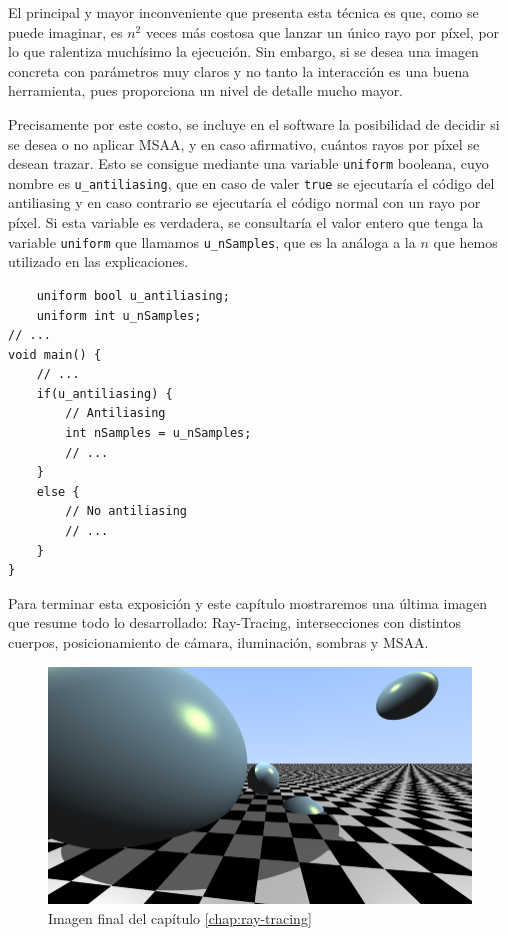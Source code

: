 El principal y mayor inconveniente que presenta esta técnica es que, como se puede imaginar, es $n^2$ veces más costosa que lanzar un único rayo por píxel, por lo que ralentiza muchísimo la ejecución. Sin embargo, si se desea una imagen concreta con parámetros muy claros y no tanto la interacción es una buena herramienta, pues proporciona un nivel de detalle mucho mayor.

Precisamente por este costo, se incluye en el software la posibilidad de decidir si se desea o no aplicar MSAA, y en caso afirmativo, cuántos rayos por píxel se desean trazar. Esto se consigue mediante una variable \verb|uniform| booleana, cuyo nombre es \verb|u_antiliasing|, que en caso de valer \verb|true| se ejecutaría el código del antiliasing y en caso contrario se ejecutaría el código normal con un rayo por píxel. Si esta variable es verdadera, se consultaría el valor entero que tenga la variable \verb|uniform| que llamamos \verb|u_nSamples|, que es la análoga a la $n$ que hemos utilizado en las explicaciones. 

\begin{lstlisting}
    uniform bool u_antiliasing;
    uniform int u_nSamples;
// ...
void main() {
    // ... 
    if(u_antiliasing) {
        // Antiliasing
        int nSamples = u_nSamples;
        // ... 
    }
    else {
        // No antiliasing
        // ...
    }
}   
\end{lstlisting}

Para terminar esta exposición y este capítulo mostraremos una última imagen que resume todo lo desarrollado: Ray-Tracing, intersecciones con distintos cuerpos, posicionamiento de cámara, iluminación, sombras y MSAA.


\begin{figure} [ht]
    \centering
    \includegraphics[scale = 0.45]{img/C7/imagen-final.png}
    \caption{Imagen final del capítulo \ref{chap:ray-tracing}}
    \label{fig:imagen-final}
\end{figure}

